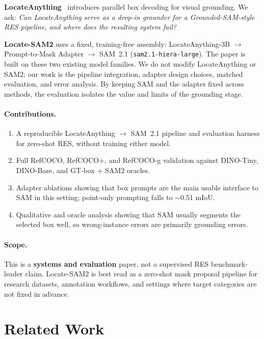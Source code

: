 \documentclass[11pt,a4paper]{article}
\begin{document}
\textbf{LocateAnything}~\cite{wang2026locateanything} introduces parallel box decoding for visual grounding.
We ask:
\emph{Can LocateAnything serve as a drop-in grounder for a Grounded-SAM-style RES pipeline, and where does the resulting system fail?}

\textbf{Locate-SAM2} uses a fixed, training-free assembly:
LocateAnything-3B $\rightarrow$ Prompt-to-Mask Adapter $\rightarrow$ SAM~2.1 (\texttt{sam2.1-hiera-large}).
The paper is built on these two existing model families.
We do not modify LocateAnything or SAM2; our work is the pipeline integration, adapter design choices, matched evaluation, and error analysis.
By keeping SAM and the adapter fixed across methods, the evaluation isolates the value and limits of the grounding stage.

\paragraph{Contributions.}
\begin{enumerate}
  \item A reproducible LocateAnything $\rightarrow$ SAM~2.1 pipeline and evaluation harness for zero-shot RES, without training either model.
  \item Full RefCOCO, RefCOCO+, and RefCOCO-g validation against DINO-Tiny, DINO-Base, and GT-box + SAM2 oracles.
  \item Adapter ablations showing that box prompts are the main usable interface to SAM in this setting; point-only prompting falls to $\sim$0.51 mIoU.
  \item Qualitative and oracle analysis showing that SAM usually segments the selected box well, so wrong-instance errors are primarily grounding errors.
\end{enumerate}

\paragraph{Scope.}
This is a \textbf{systems and evaluation} paper, not a supervised RES benchmark-leader claim.
Locate-SAM2 is best read as a zero-shot mask proposal pipeline for research datasets, annotation workflows, and settings where target categories are not fixed in advance.

\section{Related Work}
\label{sec:related}
\end{document}
